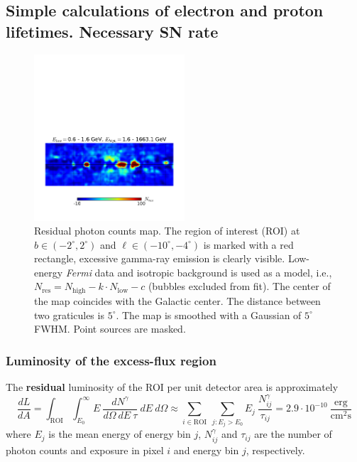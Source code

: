 \documentclass[a4paper]{article}
\begin{document}
\subsection{Simple calculations of electron and proton lifetimes. Necessary SN rate}


\begin{figure}[h]
\vspace*{-3cm}
	\centering
	\includegraphics[width=0.5\textwidth]{gnomview_1}
    \caption{Residual photon counts map. The region of interest (ROI) at $b \in (-2^\circ, 2^\circ)$ and $\ell \in (-10^\circ, -4^\circ)$ is marked with a red rectangle, excessive gamma-ray emission is clearly visible. Low-energy \textit{Fermi} data and isotropic background is used as a model, i.e., $N_\text{res} = N_\text{high} - k \cdot N_\text{low} - c$ (bubbles excluded from fit). The center of the map coincides with the Galactic center. The distance between two graticules is $5^\circ$. The map is smoothed with a Gaussian of $5^\circ$ FWHM. Point sources are masked.}
    \label{gnomview}
\end{figure}

\subsubsection{Luminosity of the excess-flux region}
The \textbf{residual} luminosity of the ROI per unit detector area is approximately 
\begin{equation}
\label{eq_dLdA}
\frac{dL}{dA} = \int_\text{ROI} \int_{E_0}^\infty E\ \frac{dN^\gamma}{d\Omega\ dE\ \tau}\ dE\ d\Omega \approx \sum_{i \in \text{ROI}}\ \sum_{j: E_j > E_0}  E_j\ \frac{N_{ij}^\gamma}{\tau_{ij}} = 2.9 \cdot 10^{-10}\ \frac{\text{erg}}{\text{cm}^2\text{s}}
\end{equation}
where $E_j$ is the mean energy of energy bin $j$, $N_{ij}^\gamma$ and $\tau_{ij}$ are the number of photon counts and exposure in pixel $i$ and energy bin $j$, respectively.\\
\end{document}
